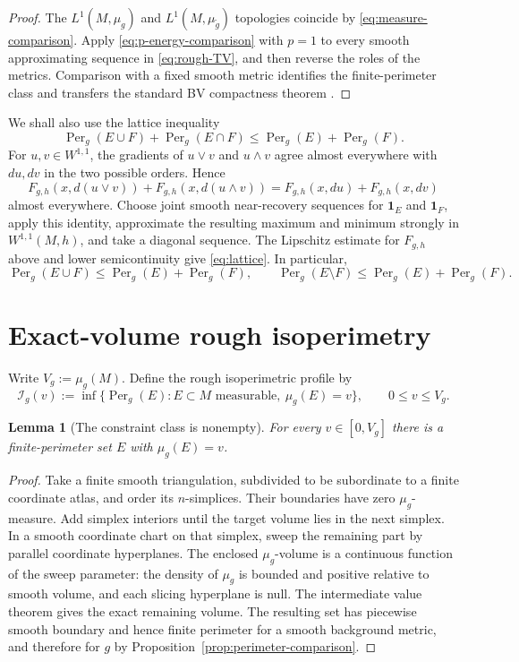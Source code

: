\documentclass[11pt]{amsart}
\newtheorem{lemma}[theorem]{Lemma}
\theoremstyle{definition}
\theoremstyle{remark}
\newcommand{\Per}{\operatorname{Per}}
\newcommand{\one}{\mathbf 1}
\newcommand{\cI}{\mathcal I}
\begin{document}
\begin{proof}
The $L^1(M,\mu_g)$ and $L^1(M,\mu_{\widetilde g})$ topologies coincide by
\eqref{eq:measure-comparison}.  Apply
\eqref{eq:p-energy-comparison} with $p=1$ to every smooth approximating
sequence in \eqref{eq:rough-TV}, and then reverse the roles of the metrics.
Comparison with a fixed smooth metric identifies the finite-perimeter class
and transfers the standard BV compactness theorem \cite{AFP2000}.
\end{proof}

We shall also use the lattice inequality
\begin{equation}\label{eq:lattice}
 \Per_g(E\cup F)+\Per_g(E\cap F)
 \leq \Per_g(E)+\Per_g(F).
\end{equation}
For $u,v\in W^{1,1}$, the gradients of $u\vee v$ and $u\wedge v$ agree almost
everywhere with $du,dv$ in the two possible orders.  Hence
\[
 F_{g,h}(x,d(u\vee v))+F_{g,h}(x,d(u\wedge v))
 =F_{g,h}(x,du)+F_{g,h}(x,dv)
\]
almost everywhere.  Choose joint smooth near-recovery sequences for
$\one_E$ and $\one_F$, apply this identity, approximate the resulting maximum
and minimum strongly in $W^{1,1}(M,h)$, and take a diagonal sequence.  The
Lipschitz estimate for $F_{g,h}$ above and lower semicontinuity give
\eqref{eq:lattice}.  In particular,
\begin{equation}\label{eq:union-cost}
 \Per_g(E\cup F)\leq\Per_g(E)+\Per_g(F),
 \qquad
 \Per_g(E\setminus F)\leq\Per_g(E)+\Per_g(F).
\end{equation}

\section{Exact-volume rough isoperimetry}

Write $V_g:=\mu_g(M)$.  Define the rough isoperimetric profile by
\begin{equation}\label{eq:profile}
 \cI_g(v):=\inf\bigl\{\Per_g(E):E\subset M\text{ measurable},\
 \mu_g(E)=v\bigr\},
 \qquad 0\leq v\leq V_g.
\end{equation}

\begin{lemma}[The constraint class is nonempty]\label{lem:constraint}
For every $v\in[0,V_g]$ there is a finite-perimeter set $E$ with
$\mu_g(E)=v$.
\end{lemma}

\begin{proof}
Take a finite smooth triangulation, subdivided to be subordinate to a finite
coordinate atlas, and order its $n$-simplices.  Their
boundaries have zero $\mu_g$-measure.  Add simplex interiors until the target
volume lies in the next simplex.  In a smooth coordinate chart on that
simplex, sweep the remaining part by parallel coordinate hyperplanes.  The
enclosed $\mu_g$-volume is a continuous function of the sweep parameter: the
density of $\mu_g$ is bounded and positive relative to smooth volume, and
each slicing hyperplane is null.  The intermediate value theorem gives the
exact remaining volume.  The resulting set has piecewise smooth boundary and
hence finite perimeter for a smooth background metric, and therefore for $g$
by Proposition~\ref{prop:perimeter-comparison}.
\end{proof}
\end{document}
